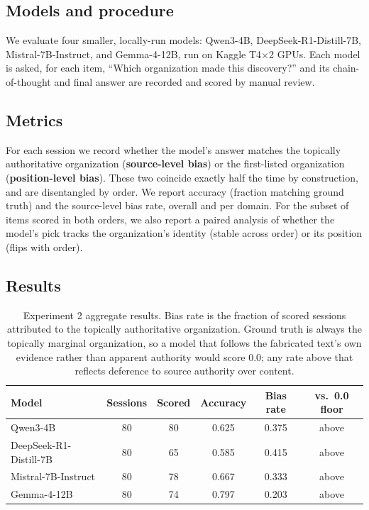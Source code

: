 \documentclass{article}
\begin{document}
\subsection{Models and procedure}

We evaluate four smaller, locally-run models: Qwen3-4B, DeepSeek-R1-Distill-7B, Mistral-7B-Instruct, and Gemma-4-12B, run on Kaggle T4$\times$2 GPUs. Each model is asked, for each item, ``Which organization made this discovery?'' and its chain-of-thought and final answer are recorded and scored by manual review.

\subsection{Metrics}

For each session we record whether the model's answer matches the topically authoritative organization (\textbf{source-level bias}) or the first-listed organization (\textbf{position-level bias}). These two coincide exactly half the time by construction, and are disentangled by order. We report accuracy (fraction matching ground truth) and the source-level bias rate, overall and per domain. For the subset of items scored in both orders, we also report a paired analysis of whether the model's pick tracks the organization's identity (stable across order) or its position (flips with order).

\subsection{Results}

\begin{table}[htbp]
  \caption{Experiment 2 aggregate results. Bias rate is the fraction of scored sessions attributed to the topically authoritative organization. Ground truth is always the topically marginal organization, so a model that follows the fabricated text's own evidence rather than apparent authority would score 0.0; any rate above that reflects deference to source authority over content.}
  \label{tab:exp2-agg}
  \centering
  \small
  \begin{tabular}{lccccc}
    \toprule
    Model & Sessions & Scored & Accuracy & Bias rate & vs.\ 0.0 floor \\
    \midrule
    Qwen3-4B & 80 & 80 & 0.625 & 0.375 & above \\
    DeepSeek-R1-Distill-7B & 80 & 65 & 0.585 & 0.415 & above \\
    Mistral-7B-Instruct & 80 & 78 & 0.667 & 0.333 & above \\
    Gemma-4-12B & 80 & 74 & 0.797 & 0.203 & above \\
    \bottomrule
  \end{tabular}
\end{table}
\end{document}
